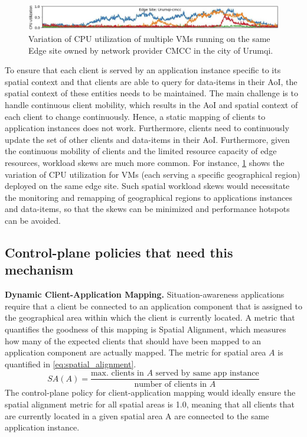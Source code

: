 \begin{figure}
\centering
\includegraphics[width=\linewidth]{figures/mechanisms/spatial_ctx_mgmt/urumqi_cpu_util.JPG}
\caption{Variation of CPU utilization of multiple VMs running on the same Edge site owned by network provider CMCC in the city of Urumqi.}
\label{fig:vm_util}
\end{figure}
\par To ensure that each client is served by an application instance specific to its spatial context and that clients are able to query for data-items in their AoI, the spatial context of these entities needs to be maintained. The main challenge is to handle continuous client mobility, which results in the AoI and spatial context of each client to change continuously. Hence, a static mapping of clients to application instances does not work. Furthermore, clients need to continuously update the set of other clients and data-items in their AoI. Furthermore, given the continuous mobility of clients and the limited resource capacity of edge resources, workload skews are much more common. For instance, \cref{fig:vm_util} shows the variation of CPU utilization for VMs (each serving a specific geographical region) deployed on the same edge site. Such spatial workload skews would necessitate the monitoring and remapping of geographical regions to applications instances and data-items, so that the skews can be minimized and performance hotspots can be avoided.

\subsection{Control-plane policies that need this mechanism}
\par \textbf{Dynamic Client-Application Mapping. } Situation-awareness applications require that a client be connected to an application component that is assigned to the geographical area within which the client is currently located. A metric that quantifies the goodness of this mapping is Spatial Alignment, which measures how many of the expected clients that should have been mapped to an application component are actually mapped. The metric for spatial area $A$ is quantified in \cref{eq:spatial_alignment}.
\begin{equation}
SA \left( A \right) = \dfrac{\text{max. clients in }A\text{ served by same app instance}}{\text{number of clients in }A}
\label{eq:spatial_alignment}
\end{equation}
The control-plane policy for client-application mapping would ideally ensure the spatial alignment metric for all spatial areas is 1.0, meaning that all clients that are currently located in a given spatial area A are connected to the same application instance.

